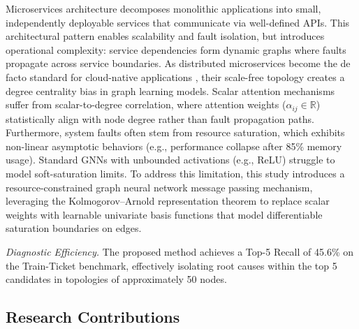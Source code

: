 \documentclass[conference]{IEEEtran}
\begin{document}
Microservices architecture decomposes monolithic applications into small, independently deployable services that communicate via well-defined APIs. This architectural pattern enables scalability and fault isolation, but introduces operational complexity: service dependencies form dynamic graphs where faults propagate across service boundaries. As distributed microservices become the de facto standard for cloud-native applications \cite{microservices_survey}, their scale-free topology creates a degree centrality bias in graph learning models. Scalar attention mechanisms suffer from scalar-to-degree correlation, where attention weights ($\alpha_{ij} \in \mathbb{R}$) statistically align with node degree rather than fault propagation paths. Furthermore, system faults often stem from resource saturation, which exhibits non-linear asymptotic behaviors (e.g., performance collapse after 85\% memory usage). Standard GNNs with unbounded activations (e.g., ReLU) struggle to model soft-saturation limits. To address this limitation, this study introduces a resource-constrained graph neural network message passing mechanism, leveraging the Kolmogorov--Arnold representation theorem \cite{kolmogorov1957,kan2024} to replace scalar weights with learnable univariate basis functions that model differentiable saturation boundaries on edges.

\textit{Diagnostic Efficiency.} The proposed method achieves a Top-5 Recall of 45.6\% on the Train-Ticket benchmark, effectively isolating root causes within the top 5 candidates in topologies of approximately 50 nodes.

\subsection{Research Contributions}
\end{document}
